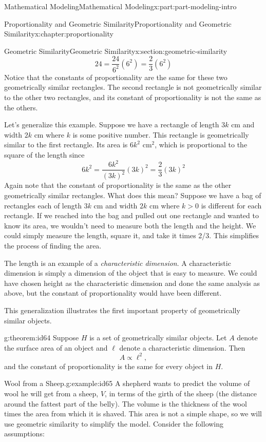 \documentclass[oneside,10pt,]{book}
\numberwithin{equation}{section}
\begin{document}
\begin{partptx}{Mathematical Modeling}{}{Mathematical Modeling}{}{}{x:part:part-modeling-intro}
\begin{chapterptx}{Proportionality and Geometric Similarity}{}{Proportionality and Geometric Similarity}{}{}{x:chapter:proportionality}
\begin{sectionptx}{Geometric Similarity}{}{Geometric Similarity}{}{}{x:section:geometric-similarity}
%
\begin{equation*}
24 = \frac{24}{6^2} (6^2) = \frac23(6^2)
\end{equation*}
Notice that the constants of proportionality are the same for these two geometrically similar rectangles. The second rectangle is not geometrically similar to the other two rectangles, and its constant of proportionality is not the same as the others.%
\par
Let’s generalize this example. Suppose we have a rectangle of length \(3k\) cm and width \(2k\) cm where \(k\) is some positive number. This rectangle is geometrically similar to the first rectangle. Its area is \(6k^2 \text{ cm}^2\), which is proportional to the square of the length since%
%
\begin{equation*}
6k^2 = \frac{6k^2}{(3k)^2}(3k)^2 = \frac23(3k)^2
\end{equation*}
Again note that the constant of proportionality is the same as the other geometrically similar rectangles. What does this mean? Suppose we have a bag of rectangles each of length \(3k\) cm and width \(2k\) cm where \(k > 0\) is different for each rectangle. If we reached into the bag and pulled out one rectangle and wanted to know its area, we wouldn’t need to measure both the length and the height. We could simply measure the length, square it, and take it times 2\slash{}3. This simplifies the process of finding the area.%
\par
The length is an example of a \emph{characteristic dimension}. A characteristic dimension is simply a dimension of the object that is easy to measure. We could have chosen height as the characteristic dimension and done the same analysis as above, but the constant of proportionality would have been different.%
\par
This generalization illustrates the first important property of geometrically similar objects.%
\begin{theorem}{}{}{g:theorem:id64}%
Suppose \(H\) is a set of geometrically similar objects. Let \(A\) denote the surface area of an object and \(\ell\) denote a characteristic dimension. Then%
%
\begin{equation*}
A\propto \ell^2,
\end{equation*}
and the constant of proportionality is the same for every object in \(H\).%
\end{theorem}
\begin{example}{Wool from a Sheep.}{g:example:id65}%
A shepherd wants to predict the volume of wool he will get from a sheep, \(V\), in terms of the girth of the sheep (the distance around the fattest part of the belly). The volume is the thickness of the wool times the area from which it is shaved. This area is not a simple shape, so we will use geometric similarity to simplify the model. Consider the following assumptions:%

\end{example}
\end{sectionptx}
\end{chapterptx}
\end{partptx}
\end{document}
